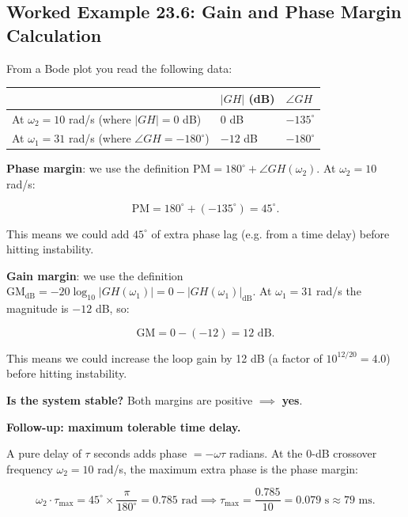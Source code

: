 \documentclass[11pt]{article}
\begin{document}
\subsection*{Worked Example 23.6: Gain and Phase Margin Calculation}

From a Bode plot you read the following data:

\begin{center}
\begin{tabular}{|l|l|l|}
\hline
\textbf{} & \textbf{$\lvert GH \rvert$ (dB)} & \textbf{$\angle GH$} \\
\hline
At $\omega_2 = 10$ rad/s (where $\lvert GH \rvert = 0$ dB) & 0 dB & $-135^\circ$ \\
\hline
At $\omega_1 = 31$ rad/s (where $\angle GH = -180^\circ$) & $-12$ dB & $-180^\circ$ \\
\hline
\end{tabular}
\end{center}

\textbf{Phase margin}: we use the definition $\mathrm{PM} = 180^\circ + \angle GH(\omega_2)$. At $\omega_2 = 10$ rad/s:

\[\mathrm{PM} = 180^\circ + (-135^\circ) = 45^\circ.\]

This means we could add $45^\circ$ of extra phase lag (e.g. from a time delay) before hitting instability.

\textbf{Gain margin}: we use the definition $\mathrm{GM}_{\mathrm{dB}} = -20 \log_{10} \lvert GH(\omega_1)\rvert = 0 - \lvert GH(\omega_1) \rvert_{\mathrm{dB}}$. At $\omega_1 = 31$ rad/s the magnitude is $-12$ dB, so:

\[\mathrm{GM} = 0 - (-12) = 12 \text{ dB}.\]

This means we could increase the loop gain by 12 dB (a factor of $10^{12/20} = 4.0$) before hitting instability.

\textbf{Is the system stable?} Both margins are positive $\implies$ \textbf{yes}.

\textbf{Follow-up: maximum tolerable time delay.}

A pure delay of $\tau$ seconds adds phase $= -\omega\tau$ radians. At the 0-dB crossover frequency $\omega_2 = 10$ rad/s, the maximum extra phase is the phase margin:

\[\omega_2 \cdot \tau_{\max} = 45^\circ \times \frac{\pi}{180^\circ} = 0.785 \text{ rad} \implies \tau_{\max} = \frac{0.785}{10} = 0.079 \text{ s} \approx 79 \text{ ms}.\]
\end{document}
